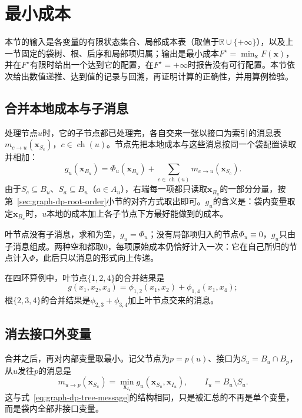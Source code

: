 
\section{最小成本}
\label{sec:graph-dp-min-cost}

本节的输入是各变量的有限状态集合、局部成本表（取值于$\mathbb R\cup\{+\infty\}$），以及上一节固定的袋树、根、后序和局部项归属；输出是最小成本$F^\star=\min_{\bm x}F(\bm x)$，并在$F^\star$有限时给出一个达到它的配置，在$F^\star=+\infty$时报告没有可行配置。本节依次给出数值递推、达到值的记录与回溯，再证明计算的正确性，并用算例检验。

\subsection{合并本地成本与子消息}
\label{sec:graph-dp-bag-merge}

处理节点$u$时，它的子节点都已处理完，各自交来一张以接口为索引的消息表$m_{c\to u}(\bm x_{S_c})$，$c\in\operatorname{ch}(u)$。节点先把本地成本与这些消息按同一个袋配置读取并相加：
\begin{equation}
g_u(\bm x_{B_u})=\Phi_u(\bm x_{B_u})+\sum_{c\in\operatorname{ch}(u)}m_{c\to u}(\bm x_{S_c}).
\label{eq:graph-dp-bag-merge}
\end{equation}
由于$S_c\subseteq B_u$、$S_a\subseteq B_u$（$a\in A_u$），右端每一项都只读取$\bm x_{B_u}$的一部分分量，按第~\ref{sec:graph-dp-root-order}小节的对齐方式取出即可。$g_u$的含义是：袋内变量取定$\bm x_{B_u}$时，$u$本地的成本加上各子节点下方最好能做到的成本。

叶节点没有子消息，求和为空，$g_u=\Phi_u$；没有局部项归入的节点$\Phi_u\equiv0$，$g_u$只由子消息组成。两种空和都取$0$，每项原始成本仍恰好计入一次：它在自己所归的节点计入$\Phi$，此后只以消息的形式向上传递。

在四环算例中，叶节点$\{1,2,4\}$的合并结果是
\[
g(x_1,x_2,x_4)=\phi_{1,2}(x_1,x_2)+\phi_{1,4}(x_1,x_4);
\]
根$\{2,3,4\}$的合并结果是$\phi_{2,3}+\phi_{3,4}$加上叶节点交来的消息。

\subsection{消去接口外变量}
\label{sec:graph-dp-bag-idea}
\label{sec:graph-dp-elimination-idea}

合并之后，再对内部变量取最小。记父节点为$p=p(u)$、接口为$S_u=B_u\cap B_p$，从$u$发往$p$的消息是
\begin{equation}
m_{u\to p}(\bm x_{S_u})=\min_{\bm x_{I_u}}g_u(\bm x_{S_u},\bm x_{I_u}),\qquad I_u=B_u\setminus S_u .
\label{eq:graph-dp-bag-message}
\end{equation}
这与式~\eqref{eq:graph-dp-tree-message}的结构相同，只是被汇总的不再是单个变量，而是袋内全部非接口变量。

